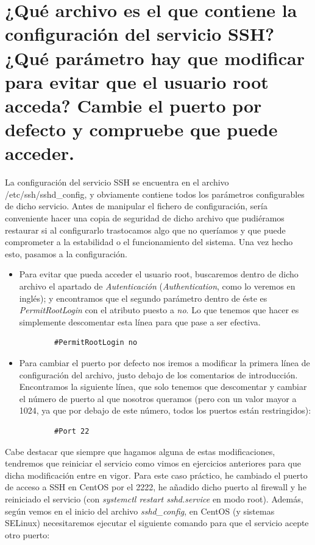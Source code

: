 \section{¿Qué archivo es el que contiene la configuración del servicio SSH? ¿Qué parámetro hay que modificar para evitar que el usuario root acceda? Cambie el puerto por defecto y compruebe que puede acceder.}
La configuración del servicio SSH se encuentra en el archivo /etc/ssh/sshd\_config, y obviamente contiene todos los parámetros configurables de dicho servicio. Antes de manipular el fichero de configuración, sería conveniente hacer una copia de seguridad de dicho archivo que pudiéramos restaurar si al configurarlo trastocamos algo que no queríamos y que puede comprometer a la estabilidad o el funcionamiento del sistema. Una vez hecho esto, pasamos a la configuración.
\begin{itemize}
	\item Para evitar que pueda acceder el usuario root, buscaremos dentro de dicho archivo el apartado de \emph{Autenticación} (\emph{Authentication}, como lo veremos en inglés); y encontramos que el segundo parámetro dentro de éste es \emph{PermitRootLogin} con el atributo puesto a \emph{no}. Lo que tenemos que hacer es simplemente descomentar esta línea para que pase a ser efectiva.
	\begin{verbatim}
		#PermitRootLogin no
	\end{verbatim}
	\item Para cambiar el puerto por defecto nos iremos a modificar la primera línea de configuración del archivo, justo debajo de los comentarios de introducción. Encontramos la siguiente línea, que solo tenemos que descomentar y cambiar el número de puerto al que nosotros queramos (pero con un valor mayor a 1024, ya que por debajo de este número, todos los puertos están restringidos):
	\begin{verbatim}
		#Port 22
	\end{verbatim}
\end{itemize}
Cabe destacar que siempre que hagamos alguna de estas modificaciones, tendremos que reiniciar el servicio como vimos en ejercicios anteriores para que dicha modificación entre en vigor. Para este caso práctico, he cambiado el puerto de acceso a SSH en CentOS por el 2222, he añadido dicho puerto al firewall y he reiniciado el servicio (con \emph{systemctl restart sshd.service} en modo root). Además, según vemos en el inicio del archivo \emph{sshd\_config}, en CentOS (y sistemas SELinux) necesitaremos ejecutar el siguiente comando para que el servicio acepte otro puerto:
